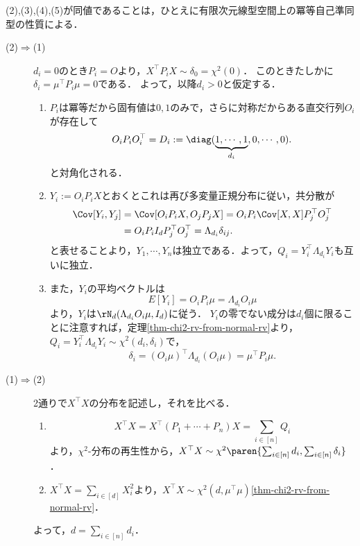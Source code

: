 \documentclass[uplatex,dvipdfmx]{jsreport}
\begin{document}
\begin{Proof}
    (2),(3),(4),(5)が同値であることは，ひとえに有限次元線型空間上の冪等自己準同型の性質による．
    \begin{description}
        \item[(2)$\Rightarrow$(1)] 
        $d_i=0$のとき$P_i=O$より，$X^\top P_iX\sim\delta_0=\chi^2(0)$．
        このときたしかに$\delta_i=\mu^\top P_i\mu=0$である．
        よって，以降$d_i>0$と仮定する．
        \begin{enumerate}[{Step}1]
            \item $P_i$は冪等だから固有値は$0,1$のみで，さらに対称だからある直交行列$O_i$が存在して
            \[O_iP_iO_i^\top=D_i:=\diag(\underbrace{1,\cdots,1}_{d_i},0,\cdots,0).\]
            と対角化される．
            \item $Y_i:=O_iP_iX$とおくとこれは再び多変量正規分布に従い，共分散が
            \begin{align*}
                \Cov[Y_i,Y_j]&=\Cov[O_iP_iX,O_jP_jX]=O_iP_i\Cov[X,X]P_j^\top O_j^\top\\
                &=O_iP_iI_dP_j^\top O_j^\top=\Lambda_{d_i}\delta_{ij}.
            \end{align*}
            と表せることより，$Y_1,\cdots,Y_n$は独立である．よって，$Q_i=Y_i^\top\Lambda_{d_i}Y_i$も互いに独立．
            \item また，$Y_i$の平均ベクトルは
            \[E[Y_i]=O_iP_i\mu=\Lambda_{d_i}O_i\mu\]
            より，$Y_i$は$\rN_d(\Lambda_{d_i}O_i\mu,I_d)$に従う．
            $Y_i$の零でない成分は$d_i$個に限ることに注意すれば，定理\ref{thm-chi2-rv-from-normal-rv}より，$Q_i=Y_i^\top\Lambda_{d_i}Y_i\sim\chi^2(d_i,\delta_i)$で，
            \[\delta_i=(O_i\mu)^\top \Lambda_{d_i}(O_i\mu)=\mu^\top P_i\mu.\]
        \end{enumerate}
        \item[(1)$\Rightarrow$(2)] 2通りで$X^\top X$の分布を記述し，それを比べる．
        \begin{enumerate}[1{通り目}]
            \item \[X^\top X=X^\top(P_1+\cdots+P_n)X=\sum_{i\in[n]}Q_i\]
            より，$\chi^2$-分布の再生性から，$X^\top X\sim\chi^2\paren{\sum_{i\in[n]}d_i,\sum_{i\in[n]}\delta_i}$．
            \item $X^\top X=\sum_{i\in[d]}X_i^2$より，$X^\top X\sim\chi^2(d,\mu^\top\mu)$\ref{thm-chi2-rv-from-normal-rv}．
        \end{enumerate}
        よって，$d=\sum_{i\in[n]}d_i$．
    \end{description}
\end{Proof}
\end{document}

